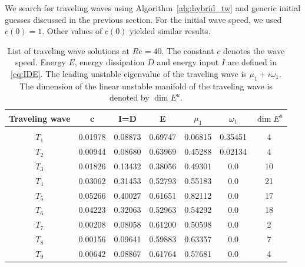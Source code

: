 \documentclass{jfm}
\begin{document}
We search for traveling waves using Algorithm~\ref{alg:hybrid_tw} and generic
initial guesses discussed in the previous section. For the initial
wave speed, we used $c(0)=1$. Other values of $c(0)$ yielded similar results.
%
\begin{table}
\centering
\begin{tabular}{c c c c c c c}
Traveling wave & c &  I=D & E & $\mu_1$ & $\omega_1$ &  $\dim E^u$ \\
\hline\\
$T_1$ & 0.01978 & 0.08873 & 0.69747 & 0.06815 & 0.35451 & 4 \\
$T_2$ & 0.00944 & 0.08680 & 0.63969 & 0.45288 & 0.02134 & 4 \\
$T_3$ & 0.01826 & 0.13432 & 0.38056 & 0.49301 & 0.0 & 10 \\
$T_4$ & 0.03062 & 0.31453 & 0.52793 & 0.55183 & 0.0 & 21 \\
$T_5$ & 0.05266 & 0.40027 & 0.61651 & 0.82112 & 0.0 & 17 \\
$T_6$ & 0.04223 & 0.32063 & 0.52963 & 0.54292 & 0.0 & 18 \\
$T_7$ & 0.00208 & 0.08058 & 0.61200 & 0.50598 & 0.0 & 2 \\
$T_8$ & 0.00156 & 0.09641 & 0.59883 & 0.63357 & 0.0 & 7 \\
$T_9$ & 0.00642 & 0.08867 & 0.61764 & 0.57681 & 0.0 & 4 \\
\end{tabular}
\caption{List of traveling wave solutions at $Re=40$. The constant $c$ denotes the
wave speed. Energy $E$, energy dissipation $D$ and energy input $I$ are
defined in \eqref{eq:IDE}. The leading unstable
eigenvalue of the traveling wave is $\mu_1+i\omega_1$.
The dimension of the linear unstable manifold of
the traveling wave is denoted by $\dim E^u$.}
\label{tab:TW}
\end{table}
%
\end{document}
